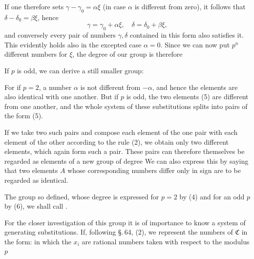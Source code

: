 If one therefore sets $\gamma - \gamma_0 = \alpha\xi$ (in case $\alpha$ is different from zero), it follows that $\delta - \delta_0 = \beta\xi$, hence
\[ \gamma = \gamma_0 + \alpha\xi, \quad \delta = \delta_0 + \beta\xi, \]
and conversely every pair of numbers $\gamma, \delta$ contained in this form also satisfies it. This evidently holds also in the excepted case $\alpha = 0$. Since we can now put $p^n$ different numbers for $\xi$, the degree of our group is therefore

If $p$ is odd, we can derive a still smaller group:

For if $p = 2$, a number $\alpha$ is not different from $-\alpha$, and hence the elements
are also identical with one another. But if $p$ is odd, the two elements (5) are different from one another, and the whole system of these substitutions splits into pairs of the form (5).

If we take two such pairs and compose each element of the one pair with each element of the other according to the rule (2), we obtain only two different elements, which again form such a pair. These pairs can therefore themselves be regarded as elements of a new group of degree
We can also express this by saying that two elements $A$ whose corresponding numbers differ only in sign are to be regarded as identical.

The group so defined, whose degree is expressed for $p = 2$ by (4) and for an odd $p$ by (6), we shall call .

For the closer investigation of this group it is of importance to know a system of generating substitutions. If, following \S.\,64, (2), we represent the numbers of $\mathfrak{C}$ in the form:
in which the $x_i$ are rational numbers taken with respect to the modulus $p$

